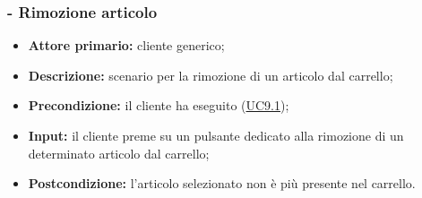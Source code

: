 \subsubsection{ - Rimozione articolo}
\begin{itemize}
    \item \textbf{Attore primario:} cliente generico;
    \item \textbf{Descrizione:} scenario per la rimozione di un articolo dal carrello;
    \item \textbf{Precondizione:} il cliente ha eseguito (\hyperref[UC9.1]{UC9.1});
    \item \textbf{Input:} il cliente preme su un pulsante dedicato alla rimozione di un determinato articolo dal carrello;
    \item \textbf{Postcondizione:} l'articolo selezionato non è più presente nel carrello.
\end{itemize}

\stepUserCase
